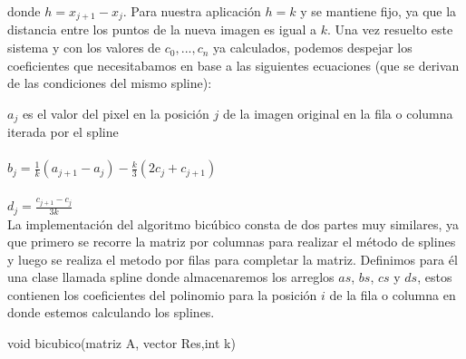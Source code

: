 donde $h = x_{j+1} - x_{j}$. Para nuestra aplicación $h = k$ y se mantiene fijo, ya que la distancia entre los puntos de la nueva imagen es igual a $k$. Una vez resuelto este sistema y con los valores de $c_{0},..., c_{n}$ ya calculados, podemos despejar los coeficientes que necesitabamos en base a las siguientes ecuaciones (que se derivan de las condiciones del mismo spline):

$a_j$ es el valor del pixel en la posición $j$ de la imagen original en la fila o columna iterada por el spline \\ \\
$b_{j} = \frac{1}{k}(a_{j+1} - a_j) - \frac{k}{3}(2c_j + c_{j+1})$ \\ \\
$d_{j} = \frac{c_{j+1} - c_{j}}{3k} $ \\

La implementación del algoritmo bicúbico consta de dos partes muy similares, ya que primero se recorre la matriz por columnas para realizar el método de splines y luego se realiza el metodo por filas para completar la matriz.
Definimos para él una clase llamada spline donde almacenaremos los arreglos $as$, $bs$, $cs$ y $ds$, estos contienen los coeficientes del polinomio para la posición $i$ de la fila o columna en donde estemos calculando los splines.

\begin{algorithm}
\begin{algorithmic}[1]\parskip=1mm
\caption{void bicubico(matriz A, vector Res,int k)}
\end{algorithmic}
\end{algorithm}

